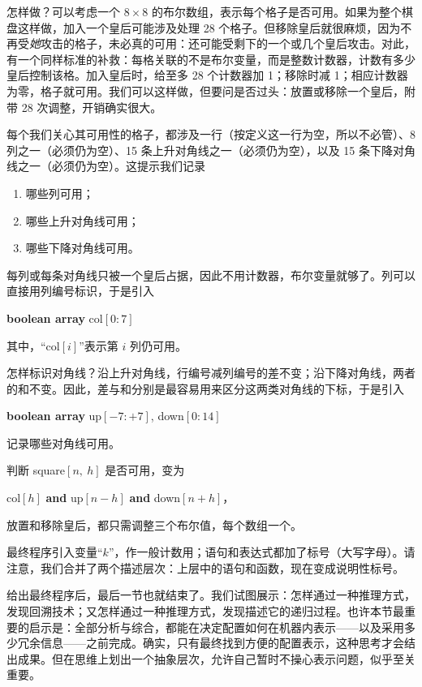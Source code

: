 怎样做？可以考虑一个 $8\times 8$ 的布尔数组，表示每个格子是否可用。如果为整个棋盘这样做，加入一个皇后可能涉及处理 28 个格子。但移除皇后就很麻烦，因为不再受\textit{她}攻击的格子，未必真的可用：还可能受剩下的一个或几个皇后攻击。对此，有一个同样标准的补救：每格关联的不是布尔变量，而是整数计数器，计数有多少皇后控制该格。加入皇后时，给至多 28 个计数器加 1；移除时减 1；相应计数器为零，格子就可用。我们可以这样做，但要问是否过头：放置或移除一个皇后，附带 28 次调整，开销确实很大。

每个我们关心其可用性的格子，都涉及一行（按定义这一行为空，所以不必管）、8 列之一（必须仍为空）、15 条上升对角线之一（必须仍为空），以及 15 条下降对角线之一（必须仍为空）。这提示我们记录

\begin{enumerate}[wide, nosep, label=(\arabic*)]
	\item 哪些列可用；
	\item 哪些上升对角线可用；
	\item 哪些下降对角线可用。
\end{enumerate}

每列或每条对角线只被一个皇后占据，因此不用计数器，布尔变量就够了。列可以直接用列编号标识，于是引入

\textbf{boolean array} col$[0:7]$

\noindent
其中，“col$[i]$”表示第 $i$ 列仍可用。

怎样标识对角线？沿上升对角线，行编号减列编号的差不变；沿下降对角线，两者的和不变。因此，差与和分别是最容易用来区分这两类对角线的下标，于是引入

\quad \textbf{boolean array} up$[-7:+7]$, down$[0:14]$

\noindent
记录哪些对角线可用。

判断 square$[n,\ h]$ 是否可用，变为

\quad col$[h]$ \textbf{and} up$[n-h]$ \textbf{and} down$[n+h]$，

\noindent
放置和移除皇后，都只需调整三个布尔值，每个数组一个。

最终程序引入变量“$k$”，作一般计数用；语句和表达式都加了标号（大写字母）。请注意，我们合并了两个描述层次：上层中的语句和函数，现在变成说明性标号。

给出最终程序后，最后一节也就结束了。我们试图展示：怎样通过一种推理方式，发现回溯技术；又怎样通过一种推理方式，发现描述它的递归过程。也许本节最重要的启示是：全部分析与综合，都能在决定配置如何在机器内表示——以及采用多少冗余信息——之前完成。确实，只有最终找到方便的配置表示，这种思考才会结出成果。但在思维上划出一个抽象层次，允许自己暂时不操心表示问题，似乎至关重要。

